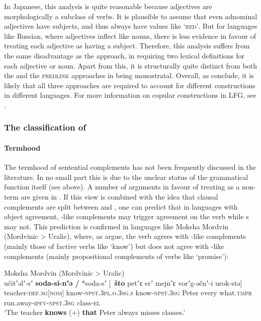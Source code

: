 \documentclass[output=paper]{../langscibook}
\begin{document}
 \ex
 \z
 \z
 
\noindent In Japanese, this analysis is quite reasonable because adjectives are morphologically a subclass of verbs. It is plausible to assume that even adnominal adjectives have subjects, and thus always have \PRED values like \textsc{`red\arglist{\SUBJ}'}. But for languages like Russian, where adjectives inflect like nouns, there is less evidence in favour of treating each adjective as having a subject. Therefore, this analysis suffers from the same disadvantage as the \XCOMP approach, in requiring two lexical definitions for each adjective or noun. Apart from this, it is structurally quite distinct from both the \XCOMP and the \textsc{predlink} approaches in being monostratal. Overall, as \citet{dalrympleetal04copular} conclude, it is likely that all three approaches are required to account for different constructions in different languages. For more information on copular constructions in LFG, see \citet[189--197]{DLM:LFG}.
 
 \newpage
 \subsubsection{The classification of \COMP\label{sect:gfs:comp-obl}} 
 \paragraph{Termhood}  The termhood of sentential complements has not been frequently discussed in the literature. In no small part this is due to the unclear status of the grammatical function \COMP itself (see  above). A number of arguments in favour of treating \COMP as a non-term \GF are given in \citet{DLM:LFG}. If this view is combined with the idea that clausal complements are split between \COMP and \OBJ \citep{DL00}, one can predict that in languages with object agreement, \OBJ-like complements may trigger agreement on the verb while {\COMP}s may not. This prediction is confirmed in languages like Moksha Mordvin (Mordvinic > Uralic), where, as \citet{BelyaevKozhemyakinaSerdobolskaya2017} argue, the verb agrees with \OBJ-like complements (mainly those of factive verbs like `know') but does not agree with \COMP-like complements (mainly propositional complements of verbs like `promise'):
 
 \ea
    Moksha Mordvin (Mordvinic > Uralic)\\
    \gll učitʼəlʼ-sʼ \textbf{soda-si-nʼə /} *soda-sʼ [~\textbf{što} petʼɛ erʼ mejnʼɛ vorʼg-əčnʼ-i urok-stə]\\
    teacher-\textsc{def.sg}[\textsc{nom}] know-\textsc{npst.3pl.o.3sg.s} \phantom{*}know-\textsc{npst.3sg} \phantom{[]}{\COMP} Peter every what.\textsc{tmpr} run.away-\textsc{ipfv-npst.3sg} class-\textsc{el}\\
    \glt `The teacher \textbf{knows} (\SUBJ+\OBJ) \textbf{that} Peter always misses classes.'
    
\end{document}
